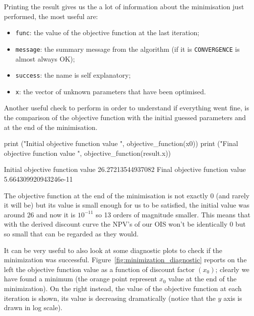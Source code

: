 Printing the result gives us the a lot of information about the minimisation just performed, the most useful are:
\begin{itemize}
\item \texttt{func}: the value of the objective function at the last iteration;
\item \texttt{message}: the summary message from the algorithm (if it is \texttt{CONVERGENCE} is almost always OK);
\item \texttt{success}: the name is self explanatory;
\item \texttt{x}: the vector of unknown parameters that have been optimised.
\end{itemize}

Another useful check to perform in order to understand if everything went fine, is the comparison of the objective function with the initial guessed parameters and at the end of the minimisation.

\begin{ipython}
print ("Initial objective function value ", objective_function(x0))
print ("Final objective function value ", objective_function(result.x))
\end{ipython}
\begin{ioutput}
Initial objective function value  26.27213544937082
Final objective function value  5.664309920943246e-11
\end{ioutput}
The objective function at the end of the minimisation is not exactly 0 (and rarely it will be) but its value is small enough for us to be satisfied, the initial value was around $26$ and now it is $10^{-11}$ so 13 orders of magnitude smaller. This means that with the derived discount curve the NPV's of our OIS won't be identically 0 but so small that can be regarded as they would.

It can be very useful to also look at some diagnostic plots to check if the minimization was successful. Figure~\ref{fig:minimization_diagnostic} reports on the left the objective function value as a function of discount factor $(x_0)$; clearly we have found a minimum (the orange point represent $x_0$ value at the end of the minimization). On the right instead, the value of the objective function at each iteration is shown, its value is decreasing dramatically (notice that the $y$ axis is drawn in log scale).


